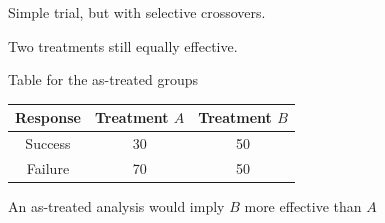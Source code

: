 \documentclass[ignorenonframetext,]{beamer}
\begin{document}
\begin{frame}{Simple trial, but with selective crossovers.}

Two treatments still equally effective.

Table for the as-treated groups

\begin{longtable}[c]{@{}ccc@{}}
\toprule
\begin{minipage}[b]{0.15\columnwidth}\centering\strut
Response
\strut\end{minipage} &
\begin{minipage}[b]{0.22\columnwidth}\centering\strut
Treatment \(A\)
\strut\end{minipage} &
\begin{minipage}[b]{0.25\columnwidth}\centering\strut
Treatment \(B\)
\strut\end{minipage}\tabularnewline
\midrule
\endhead
\begin{minipage}[t]{0.15\columnwidth}\centering\strut
Success
\strut\end{minipage} &
\begin{minipage}[t]{0.22\columnwidth}\centering\strut
30
\strut\end{minipage} &
\begin{minipage}[t]{0.25\columnwidth}\centering\strut
50
\strut\end{minipage}\tabularnewline
\begin{minipage}[t]{0.15\columnwidth}\centering\strut
Failure
\strut\end{minipage} &
\begin{minipage}[t]{0.22\columnwidth}\centering\strut
70
\strut\end{minipage} &
\begin{minipage}[t]{0.25\columnwidth}\centering\strut
50
\strut\end{minipage}\tabularnewline
\bottomrule
\end{longtable}

An as-treated analysis would imply \(B\) more effective than \(A\)

\end{frame}
\end{document}
